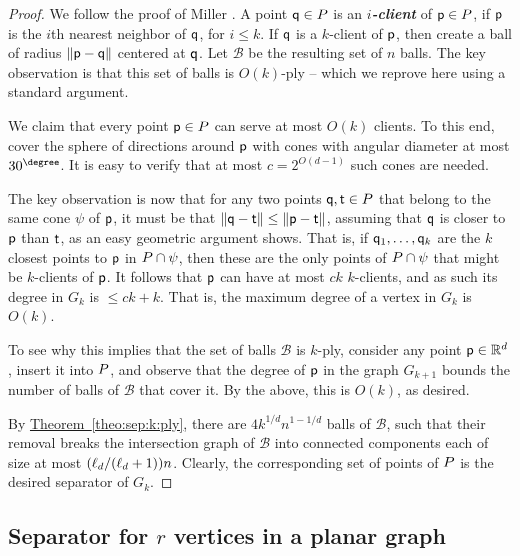 \documentclass[12pt]{article}
\theoremstyle{remark}\theoremheaderfont{\sf}\theorembodyfont{\upshape}\newtheorem{defn}[theorem]{Definition}
\renewcommand{\Re}{\mathbb{R}}
\newcommand{\HLink}[2]{\hyperref[#2]{#1~\ref*{#2}}}
\newcommand{\thmref}[1]{\HLink{Theorem}{theo:#1}}
\newcommand{\BallSet}{\mathcal{B}}\newcommand{\BallSetA}{\mathcal{C}}
\renewcommand{\th}{th\xspace}
\newcommand{\Graph}{{G}}
\newcommand{\distX}[2]{\left\| {#1} - {#2} \right\|}
\newcommand{\pth}[1]{\mleft({#1}\mright)}
\newcommand{\Cone}{\psi}\definecolor{blue25}{rgb}{0,0,0.55}\newcommand{\emphic}[2]{\textcolor{blue25}{\textbf{\emph{#1}}}\index{#2}}
\newcommand{\emphi}[1]{\emphic{#1}{#1}}
\begin{document}
\begin{proof}
    We follow the proof of Miller \etal \cite{mttv-sspnng-97}.  A
    point $\mathsf{q} \in {P}$ is an \emphi{$i$-client} of $\mathsf{p} \in
    {P}$, if $\mathsf{p}$ is the $i$\th nearest neighbor of $\mathsf{q}$, for
    $i\leq k$.  If $\mathsf{q}$ is a $k$-client of $\mathsf{p}$, then create a
    ball of radius $\distX{\pnt}{\pntA}$ centered at $\mathsf{q}$.  Let
    $\BallSet$ be the resulting set of $n$ balls. The key observation
    is that this set of balls is $O(k)$-ply -- which we reprove here
    using a standard argument.

    We claim that every point $\mathsf{p} \in {P}$ can serve at most
    $O(k)$ clients. To this end, cover the sphere of directions around
    $\mathsf{p}$ with cones with angular diameter at most $30^\degree$. It
    is easy to verify that at most $c = 2^{O(d-1)}$ such cones are
    needed.



    The key observation is now that for any two points $\mathsf{q},\mathsf{t}
    \in {P}$ that belong to the same cone $\Cone$ of $\mathsf{p}$, it
    must be that $\distX{\pntA}{\pntB} \leq \distX{\pnt}{\pntB}$,
    assuming that $\mathsf{q}$ is closer to $\mathsf{p}$ than $\mathsf{t}$, as an easy
    geometric argument shows. That is, if $\mathsf{q}_1,\ldots, \mathsf{q}_k$
    are the $k$ closest points to $\mathsf{p}$ in $\PntSet \cap \Cone$, then
    these are the only points of $\PntSet \cap \Cone$ that might be
    $k$-clients of $\mathsf{p}$. It follows that $\mathsf{p}$ can have at most $c
    k$ $k$-clients, and as such its degree in $\Graph_k$ is $\leq c k
    + k$. That is, the maximum degree of a vertex in $\Graph_k$ is
    $O(k)$.

    To see why this implies that the set of balls $\BallSet$ is
    $k$-ply, consider any point $\pnt \in \Re^d$, insert it into
    ${P}$, and observe that the degree of $\mathsf{p}$ in the graph
    $\Graph_{k+1}$ bounds the number of balls of $\BallSet$ that cover
    it. By the above, this is $O(k)$, as desired.

    By \thmref{sep:k:ply}, there are $4 k^{1/d} n^{1-1/d}$ balls of
    $\BallSet$, such that their removal breaks the intersection graph
    of $\BallSet$ into connected components each of size at most
    $\pth{ \constDbl/(\constDbl +1)} n$. Clearly, the corresponding
    set of points of ${P}$ is the desired separator of $\Graph_k$.
\end{proof}

\subsection{Separator for $r$ vertices in a planar graph}
\end{document}

